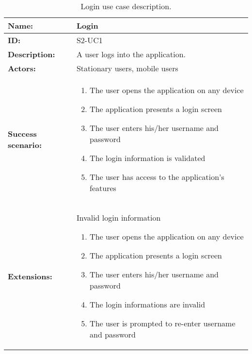\begin{table}[h!]
    \centering
    \begin{tabularx}{\textwidth}{lX}
        \toprule
        \textbf{Name:}  & Login \\ \midrule
        \textbf{ID:}    & S2-UC1 \\ \midrule
        \textbf{Description:} & A user logs into the application. \\ \midrule
        \textbf{Actors:} & Stationary users, mobile users \\ \midrule
        \textbf{Success scenario:} & 
        \begin{enumerate}
            \item The user opens the application on any device
            \item The application presents a login screen
            \item The user enters his/her username and password
            \item The login information is validated
            \item The user has access to the application's features
        \end{enumerate}
        \\ \midrule
        \textbf{Extensions:} & Invalid login information 
        \begin{enumerate}
            \item The user opens the application on any device
            \item The application presents a login screen
            \item The user enters his/her username and password
            \item The login informations are invalid
            \item The user is prompted to re-enter username and password
        \end{enumerate}
        \\ \bottomrule
    \end{tabularx}
    \caption{Login use case description.}
    \label{tab:s2-uc1}
\end{table}

